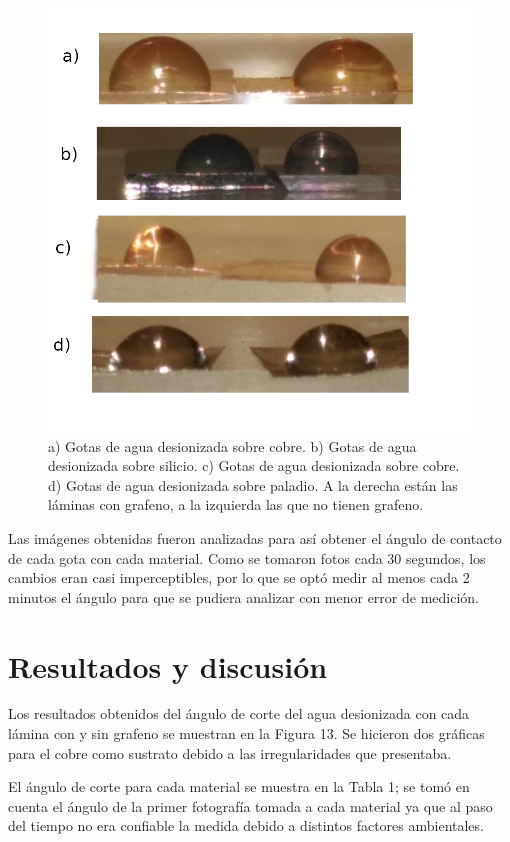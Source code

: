 \documentclass[twocolumn,letterpaper,aps,pra,10pt]{revtex4-1}
\begin{document}
\begin{figure}[hbtp]
\centering
\includegraphics[scale=0.6]{Gotas_Todo.png}
\caption{a) Gotas de agua desionizada sobre cobre. b) Gotas de agua desionizada sobre silicio. c) Gotas de agua desionizada sobre cobre. d) Gotas de agua desionizada sobre paladio. A la derecha están las láminas con grafeno, a la izquierda las que no tienen grafeno.}
\end{figure}

Las imágenes obtenidas fueron analizadas para así obtener el ángulo de contacto de cada gota con cada material. Como se tomaron fotos cada 30 segundos, los cambios eran casi imperceptibles, por lo que se optó medir al menos cada 2 minutos el ángulo para que se pudiera analizar con menor error de medición.
\section{Resultados y discusión}
Los resultados obtenidos del ángulo de corte del agua desionizada con cada lámina con y sin grafeno se muestran en la Figura 13. Se hicieron dos gráficas para el cobre como sustrato debido a las irregularidades que presentaba.

El ángulo de corte para cada material se muestra en la Tabla 1; se tomó en cuenta el ángulo de la primer fotografía tomada a cada material ya que al paso del tiempo no era confiable la medida debido a distintos factores ambientales.
\end{document}
